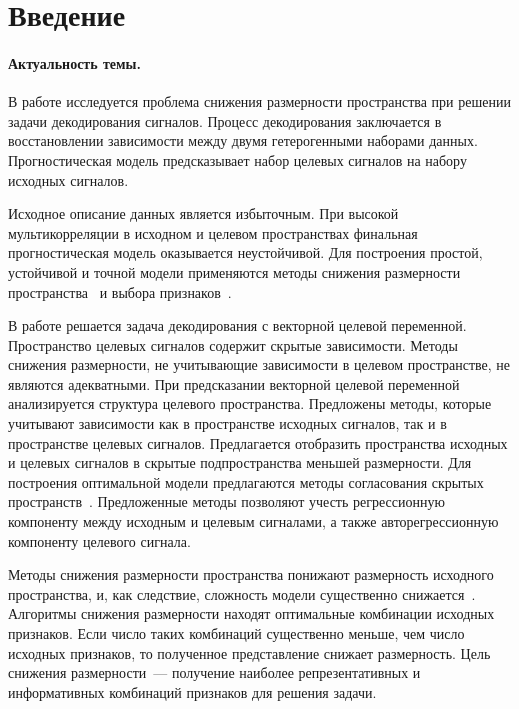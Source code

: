 \chapter*{Введение}
\subsubsection{Актуальность темы.} 
В работе исследуется проблема снижения размерности пространства при решении задачи декодирования сигналов. 
Процесс декодирования заключается в восстановлении зависимости между двумя гетерогенными наборами данных.
Прогностическая модель предсказывает набор целевых сигналов на набору исходных сигналов.

Исходное описание данных является избыточным. 
При высокой мультикорреляции в исходном и целевом пространствах финальная прогностическая модель оказывается неустойчивой.
Для построения простой, устойчивой и точной модели применяются методы снижения размерности пространства~\cite{motrenko2018multi,chun2010sparse,mehmood2012review,madala2019inductive}  и выбора признаков~\cite{katrutsa2017comprehensive,li2017feature}.

В работе решается задача декодирования с векторной целевой переменной.
Пространство целевых сигналов содержит скрытые зависимости. 
Методы снижения размерности, не учитывающие зависимости в целевом пространстве, не являются  адекватными.
При предсказании векторной целевой переменной анализируется структура целевого пространства.
Предложены методы, которые учитывают зависимости как в пространстве исходных сигналов, так и в пространстве целевых сигналов.
Предлагается отобразить пространства исходных и целевых сигналов в скрытые подпространства меньшей размерности.
Для построения оптимальной модели предлагаются методы согласования скрытых пространств~\cite{wold1975path,rosipal2005overview,eliseyev2017recursive}.
Предложенные методы позволяют учесть регрессионную компоненту между исходным и целевым сигналами, а также авторегрессионную компоненту целевого сигнала.

Методы снижения размерности пространства понижают размерность исходного пространства, и, как следствие, сложность модели существенно снижается~\cite{golyandina2001analysis,tipping1999probabilisticpca,wold1975path,hotelling1992relations}. 
Алгоритмы снижения размерности находят оптимальные комбинации исходных признаков. 
Если число таких комбинаций существенно меньше, чем число исходных признаков, то полученное представление снижает размерность.
Цель снижения размерности~--- получение наиболее репрезентативных и информативных комбинаций признаков для решения задачи.

